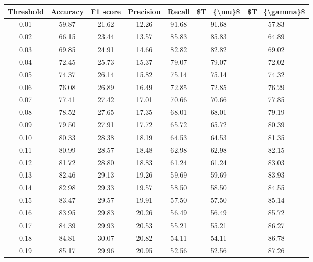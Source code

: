 \begin{tabular}{|c|c|c|c|c|c|c|}
\hline
 Threshold &  Accuracy &  F1 score &  Precision &  Recall &  \$T\_\{\textbackslash mu\}\$ &  \$T\_\{\textbackslash gamma\}\$ \\
\hline
      0.01 &     59.87 &     21.62 &      12.26 &   91.68 &      91.68 &         57.83 \\
      0.02 &     66.15 &     23.44 &      13.57 &   85.83 &      85.83 &         64.89 \\
      0.03 &     69.85 &     24.91 &      14.66 &   82.82 &      82.82 &         69.02 \\
      0.04 &     72.45 &     25.73 &      15.37 &   79.07 &      79.07 &         72.02 \\
      0.05 &     74.37 &     26.14 &      15.82 &   75.14 &      75.14 &         74.32 \\
      0.06 &     76.08 &     26.89 &      16.49 &   72.85 &      72.85 &         76.29 \\
      0.07 &     77.41 &     27.42 &      17.01 &   70.66 &      70.66 &         77.85 \\
      0.08 &     78.52 &     27.65 &      17.35 &   68.01 &      68.01 &         79.19 \\
      0.09 &     79.50 &     27.91 &      17.72 &   65.72 &      65.72 &         80.39 \\
      0.10 &     80.33 &     28.38 &      18.19 &   64.53 &      64.53 &         81.35 \\
      0.11 &     80.99 &     28.57 &      18.48 &   62.98 &      62.98 &         82.15 \\
      0.12 &     81.72 &     28.80 &      18.83 &   61.24 &      61.24 &         83.03 \\
      0.13 &     82.46 &     29.13 &      19.26 &   59.69 &      59.69 &         83.93 \\
      0.14 &     82.98 &     29.33 &      19.57 &   58.50 &      58.50 &         84.55 \\
      0.15 &     83.47 &     29.57 &      19.91 &   57.50 &      57.50 &         85.14 \\
      0.16 &     83.95 &     29.83 &      20.26 &   56.49 &      56.49 &         85.72 \\
      0.17 &     84.39 &     29.93 &      20.53 &   55.21 &      55.21 &         86.27 \\
      0.18 &     84.81 &     30.07 &      20.82 &   54.11 &      54.11 &         86.78 \\
      0.19 &     85.17 &     29.96 &      20.95 &   52.56 &      52.56 &         87.26 \\

\end{tabular}
